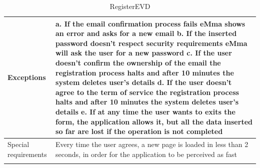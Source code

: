 \begin{center}
\begin{longtable}{p{4cm} p{11cm}}
     \hline
     Exceptions &  
        a. If the email confirmation process fails eMma shows an error and asks for a new email\newline
        b. If the inserted password doesn't respect security requirements eMma will ask the user for a new password \newline
        c. If the user doesn't confirm the ownership of the email the registration process halts and after 10 minutes the system deletes user's details \newline
        d. If the user doesn't agree to the term of service the registration process halts and after 10 minutes the system deletes user's details \newline
        e. If at any time the user wants to exits the form, the application allows it, but all the data inserted so far are lost if the operation is not completed \\
     \hline
     Special requirements &  Every time the user agrees, a new page is loaded in less than 2 seconds, in order for the application to be perceived as fast \\
     \hline
    \caption{RegisterEVD}
    \label{tab:RegisterEVD}
    \end{longtable}
\end{center}

